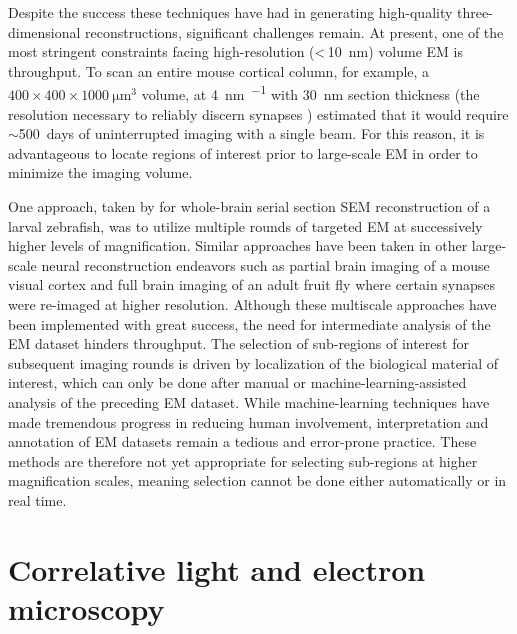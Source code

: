Despite the success these techniques have had in generating high-quality three-dimensional reconstructions, significant challenges remain. At present, one of the most stringent constraints facing high-resolution (<\,\SI{10}{\nano\meter}) volume EM is throughput. To scan an entire mouse cortical column, for example, a $400 \times 400 \times \SI{1000}{\micro\meter^3}$ volume, at \SI{4}{\nano\meter\per\pixel} with \SI{30}{\nano\meter} section thickness (the resolution necessary to reliably discern synapses \cite{harris1989dendritic, meinertzhagen1991synaptic}) \textcite{briggman2012volume} estimated that it would require ${\sim}$\SI{500}{days} of uninterrupted imaging with a single beam. For this reason, it is advantageous to locate regions of interest prior to large-scale EM in order to minimize the imaging volume.

One approach, taken by \textcite{hildebrand2017whole} for whole-brain serial section SEM reconstruction of a larval zebrafish, was to utilize multiple rounds of targeted EM at successively higher levels of magnification. Similar approaches have been taken in other large-scale neural reconstruction endeavors such as partial brain imaging of a mouse visual cortex \cite{bock2011network} and full brain imaging of an adult fruit fly \cite{zheng2018complete} where certain synapses were re-imaged at higher resolution. Although these multiscale approaches have been implemented with great success, the need for intermediate analysis of the EM dataset hinders throughput. The selection of sub-regions of interest for subsequent imaging rounds is driven by localization of the biological material of interest, which can only be done after manual or machine-learning-assisted analysis of the preceding EM dataset. While machine-learning techniques have made tremendous progress in reducing human involvement, interpretation and annotation of EM datasets remain a tedious and error-prone practice. These methods are therefore not yet appropriate for selecting sub-regions at higher magnification scales, meaning selection cannot be done either automatically or in real time.


\section{Correlative light and electron microscopy}
\label{sec:1_CLEM}

